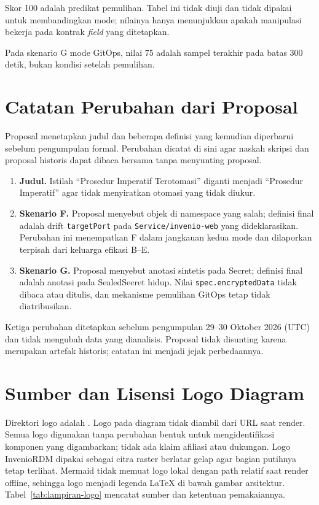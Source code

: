 Skor 100 adalah predikat pemulihan. Tabel ini tidak diuji dan tidak dipakai untuk membandingkan mode; nilainya hanya menunjukkan apakah manipulasi bekerja pada kontrak \textit{field} yang ditetapkan.

\noindent\footnotesize Pada skenario G mode GitOps, nilai 75 adalah sampel terakhir pada batas 300 detik, bukan kondisi setelah pemulihan.\normalsize

\section{Catatan Perubahan dari Proposal}

Proposal menetapkan judul dan beberapa definisi yang kemudian diperbarui sebelum pengumpulan formal. Perubahan dicatat di sini agar naskah skripsi dan proposal historis dapat dibaca bersama tanpa menyunting proposal.

\begin{enumerate}
  \item \textbf{Judul.} Istilah ``Prosedur Imperatif Terotomasi'' diganti menjadi ``Prosedur Imperatif'' agar tidak menyiratkan otomasi yang tidak diukur. %
  \item \textbf{Skenario F.} Proposal menyebut objek di namespace yang salah; definisi final adalah drift \texttt{targetPort} pada \texttt{Service/invenio-web} yang dideklarasikan. Perubahan ini menempatkan F dalam jangkauan kedua mode dan dilaporkan terpisah dari keluarga efikasi B--E.
  \item \textbf{Skenario G.} Proposal menyebut anotasi sintetis pada Secret; definisi final adalah anotasi pada SealedSecret hidup. Nilai \texttt{spec.encryptedData} tidak dibaca atau ditulis, dan mekanisme pemulihan GitOps tetap tidak diatribusikan.
\end{enumerate}

Ketiga perubahan ditetapkan sebelum pengumpulan 29--30 Oktober 2026 (UTC) dan tidak mengubah data yang dianalisis. Proposal tidak disunting karena merupakan artefak historis; catatan ini menjadi jejak perbedaannya.

\section{Sumber dan Lisensi Logo Diagram}

Direktori logo adalah . Logo pada diagram tidak diambil dari URL saat render. Semua logo digunakan tanpa perubahan bentuk untuk mengidentifikasi komponen yang digambarkan; tidak ada klaim afiliasi atau dukungan. Logo InvenioRDM dipakai sebagai citra raster berlatar gelap agar bagian putihnya tetap terlihat. Mermaid tidak memuat logo lokal dengan path relatif saat render offline, sehingga logo menjadi legenda LaTeX di bawah gambar arsitektur. Tabel~\ref{tab:lampiran-logo} mencatat sumber dan ketentuan pemakaiannya.

